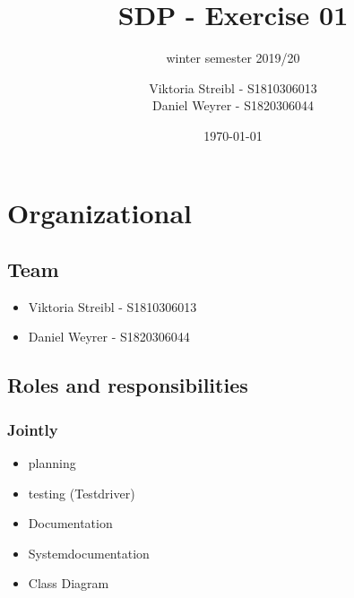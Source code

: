 

\graphicspath{{./}}





\title{SDP - Exercise 01} %
\subtitle{winter semester 2019/20} %
\author{
Viktoria Streibl - S1810306013\\
  Daniel Weyrer - S1820306044
} %
\date{\today} %

\maketitle %

\newpage
\tableofcontents %
\newpage


\section{Organizational}
\subsection{Team}
\begin{itemize}
	\item Viktoria 	Streibl 		- 	S1810306013
	\item Daniel 	Weyrer		-	S1820306044
\end{itemize}

\subsection{Roles and responsibilities}

\subsubsection{Jointly}
\begin{itemize}
	\item planning
	\item testing (Testdriver)
	\item Documentation
	\item Systemdocumentation
	\item Class Diagram
\end{itemize}

